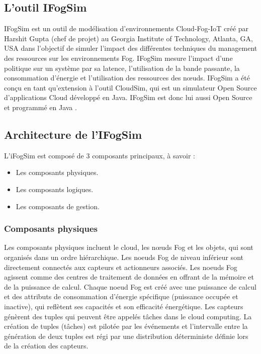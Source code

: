 \subsection{L'outil IFogSim}
IFogSim est un outil de modélisation d'environnements Cloud-Fog-IoT créé par
Harshit Gupta (chef de projet) au Georgia Institute of Technology, Atlanta, GA, USA dans l'objectif de simuler l'impact des différentes techniques du management des ressources sur les environnements Fog. IFogSim mesure l'impact d'une politique sur un système par sa latence, l'utilisation de la bande passante, la consommation d'énergie et l'utilisation des ressources des nœuds. IFogSim a été conçu en tant qu'extension à l'outil CloudSim, qui est un simulateur Open Source d'applications Cloud développé en Java. IFogSim est donc lui aussi Open Source et programmé en Java .

\subsection{Architecture de l'IFogSim}
L'iFogSim est composé de 3 composants principaux, à savoir : 
\begin{itemize}
    \item Les composants physiques.
    \item Les composants logiques.
    \item Les composants de gestion.
\end{itemize}

\subsubsection{Composants physiques}
Les composants physiques incluent le cloud, les nœuds Fog et les objets, qui sont organisés dans un ordre hiérarchique. Les noeuds Fog de niveau inférieur sont directement connectés aux capteurs et actionneurs associés. Les noeuds Fog agissent comme des centres de traitement de données en offrant de la mémoire et de la puissance de calcul. Chaque noeud Fog est créé avec une puissance de calcul et des attributs de consommation d'énergie spécifique (puissance occupée et inactive), qui reflètent ses capacités et son efficacité énergétique. Les capteurs génèrent des tuples qui peuvent être appelés tâches dans le cloud computing. La création de tuples (tâches) est pilotée par les événements et l'intervalle entre la génération de deux tuples est régi par une distribution déterministe définie lors de la création des capteurs.


